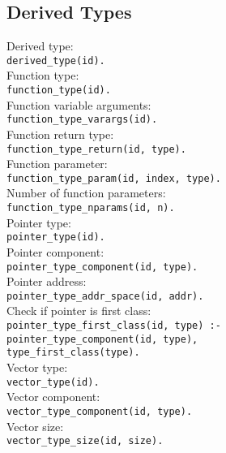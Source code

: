 \subsection{Derived Types} %
Derived type:\\
\tab \lstinline{derived_type(id).}
\\
Function type:\\
\tab \lstinline{function_type(id).}
\\
Function variable arguments:\\
\tab \lstinline{function_type_varargs(id).}
\\
Function return type:\\
\tab \lstinline{function_type_return(id, type).}
\\
Function parameter:\\
\tab \lstinline{function_type_param(id, index, type).}
\\
Number of function parameters:\\
\tab \lstinline{function_type_nparams(id, n).}
\\
Pointer type:\\
\tab \lstinline{pointer_type(id).}
\\
Pointer component:\\
\tab \lstinline{pointer_type_component(id, type).}
\\
Pointer address:\\
\tab \lstinline{pointer_type_addr_space(id, addr).}
\\
Check if pointer is first class:\\
\tab \texttt{pointer\_type\_first\_class(id, type) :- \\
            \tab\tab pointer\_type\_component(id, type), \\
            \tab\tab type\_first\_class(type).}
\\
Vector type:\\
\tab \lstinline{vector_type(id).}
\\
Vector component:\\
\tab \lstinline{vector_type_component(id, type).}
\\
Vector size:\\
\tab \lstinline{vector_type_size(id, size).}
\\
